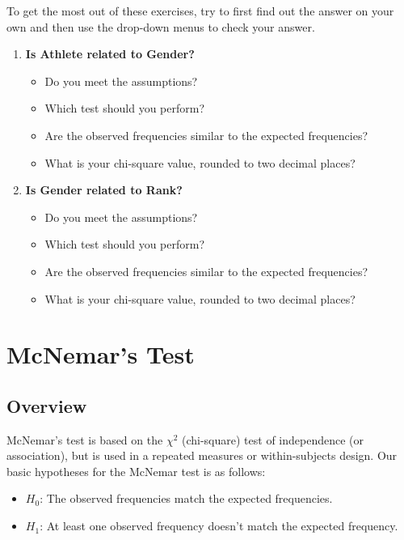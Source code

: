 \documentclass[
]{book}
\begin{document}
To get the most out of these exercises, try to first find out the answer on your own and then use the drop-down menus to check your answer.

\begin{enumerate}
\def\labelenumi{\arabic{enumi}.}
\item
  \textbf{Is Athlete related to Gender?}

  \begin{itemize}
  \item
    Do you meet the assumptions?
  \item
    Which test should you perform?
  \item
    Are the observed frequencies similar to the expected frequencies?
  \item
    What is your chi-square value, rounded to two decimal places?
  \end{itemize}
\item
  \textbf{Is Gender related to Rank?}

  \begin{itemize}
  \item
    Do you meet the assumptions?
  \item
    Which test should you perform?
  \item
    Are the observed frequencies similar to the expected frequencies?
  \item
    What is your chi-square value, rounded to two decimal places?
  \end{itemize}
\end{enumerate}

\hypertarget{mcnemars-test}{%
\section{McNemar's Test}\label{mcnemars-test}}

\hypertarget{overview-5}{%
\subsection{Overview}\label{overview-5}}

McNemar's test is based on the \(\chi^2\) (chi-square) test of independence (or association), but is used in a repeated measures or within-subjects design. Our basic hypotheses for the McNemar test is as follows:

\begin{itemize}
\item
  \(H_0\): The observed frequencies match the expected frequencies.
\item
  \(H_1\): At least one observed frequency doesn't match the expected frequency.
\end{itemize}
\end{document}
